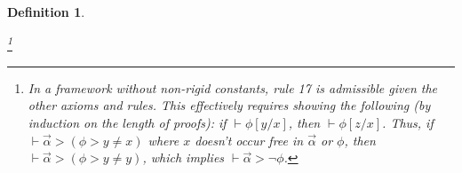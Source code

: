 \documentclass[12pt]{article}
\newtheorem{definition}{Definition}
\newcommand{\would}{\mathbin{>}}
\newcommand{\nec}{\mathop{\Box}}
\newcommand{\pos}{\mathop{\Diamond}}
\newcommand{\then}{\mathbin{\supset}}
\begin{document}
\begin{definition}
\begin{enumerate}
        \footnote{
            In a framework without non-rigid constants, rule 17 is admissible given the other axioms and rules. 
            This effectively requires showing the following (by induction on the length of proofs): if $\vdash \phi[y/x]$, then $\vdash \phi[z/x]$. 
            Thus, if $\vdash \vec{\alpha} \would (\phi \would y \neq x)$ where $x$ doesn't occur free in $\vec{\alpha}$ or $\phi$, then $\vdash \vec{\alpha} \would (\phi \would y \neq y)$, which implies $\vdash \vec{\alpha} \would \neg\phi$. 
            } %
    \end{enumerate}
\end{definition}


\end{document}

